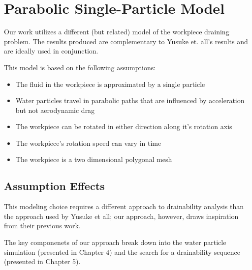 


\section{Parabolic Single-Particle Model}

Our work utilizes a different (but related) model of the workpiece draining problem. The results produced are complementary to Yusuke et. all's results and are ideally used in conjunction.

This model is based on the following assumptions:

\begin{itemize}
	\item The fluid in the workpiece is approximated by a single particle
	\item Water particles travel in parabolic paths that are influenced by acceleration but not aerodynamic drag
	\item The workpiece can be rotated in either direction along it's rotation axis
	\item The workpiece's rotation speed can vary in time
	\item The workpiece is a two dimensional polygonal mesh
\end{itemize}

	\subsection{Assumption Effects}

This modeling choice requires a different approach to drainability analysis than the approach used by Yusuke et all; our approach, however, draws inspiration from their previous work.

The key componenets of our approach break down into the water particle simulation (presented in Chapter 4) and the search for a drainability sequence (presented in Chapter 5).



